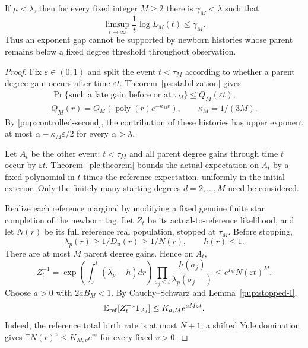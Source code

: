 \begin{theorem}\label{pup:low-survival}
If $\mu<\lambda$, then for every fixed integer $M\ge2$ there is
$\gamma_M<\lambda$ such that
\begin{equation}\label{pup:low-survival-bound}
 \limsup_{t\to\infty}\frac1t\log L_M(t)\le\gamma_M.
\end{equation}
Thus an exponent gap cannot be supported by newborn histories whose
parent remains below a fixed degree threshold throughout observation.
\end{theorem}
\begin{proof}
Fix $\varepsilon\in(0,1)$ and split the event $t<\tau_M$ according
to whether a parent degree gain occurs after time $\varepsilon t$.
Theorem~\ref{ps:stabilization} gives
\begin{gather*}
 \Pr\{\text{such a late gain before or at }\tau_M\}
 \le Q_M(\varepsilon t),\\
 Q_M(r)=O_M(\operatorname{poly}(r)e^{-\kappa_M r}),
 \qquad \kappa_M=1/(3M).
\end{gather*}
By \eqref{pup:controlled-second}, the contribution of these histories
has upper exponent at most $\alpha-\kappa_M\varepsilon/2$ for every
$\alpha>\lambda$.

Let $A_t$ be the other event: $t<\tau_M$ and all parent degree gains
through time $t$ occur by $\varepsilon t$.  Theorem~\ref{plc:theorem} bounds the actual expectation on $A_t$ by a fixed polynomial
in $t$ times the reference expectation, uniformly in the initial
exterior.  Only the finitely many starting degrees $d=2,\ldots,M$
need be considered.

Realize each reference marginal by modifying a fixed genuine finite
star completion of the newborn tag.  Let $Z_t$ be its actual-to-reference
likelihood, and let $N(r)$ be its full reference real population, stopped
at $\tau_M$.  Before stopping,
\[
 \lambda_p(r)\ge1/D_u(r)\ge1/N(r),\qquad h(r)\le1.
\]
There are at most $M$ parent degree gains.  Hence on $A_t$,
\[
 Z_t^{-1}
 =\exp\!\left(\int_0^t(\lambda_p-h)dr\right)
       \prod_{\sigma_j\le t}\frac{h(\sigma_j)}{\lambda_p(\sigma_j-)}
 \le e^{I_M}N(\varepsilon t)^M.
\]
Choose $a>0$ with $2aB_M<1$.  By Cauchy--Schwarz and
Lemma~\ref{pup:stopped-I},
\begin{equation}\label{pup:prefix-inverse}
 \mathbb E_{\rm ref}[Z_t^{-a}\mathbf1_{A_t}]
 \le K_{a,M}e^{aM\varepsilon t}.
\end{equation}
Indeed, the reference total birth rate is at most $N+1$; a shifted Yule
domination gives $\mathbb E N(r)^v\le K_{M,v}e^{vr}$ for every fixed
$v>0$.


\end{proof}
